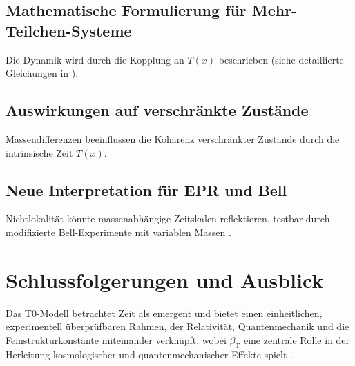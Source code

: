 \documentclass[12pt,a4paper]{article}
\newcommand{\Tfield}{T(x)}
\newcommand{\betaT}{\beta_{\text{T}}}
\begin{document}
	\subsection{Mathematische Formulierung für Mehr-Teilchen-Systeme}
	Die Dynamik wird durch die Kopplung an \(\Tfield\) beschrieben (siehe detaillierte Gleichungen in \cite{pascher_lagrange_2025}).
	
	\subsection{Auswirkungen auf verschränkte Zustände}
	Massendifferenzen beeinflussen die Kohärenz verschränkter Zustände durch die intrinsische Zeit \(\Tfield\).
	
	\subsection{Neue Interpretation für EPR und Bell}
	Nichtlokalität könnte massenabhängige Zeitskalen reflektieren, testbar durch modifizierte Bell-Experimente mit variablen Massen \cite{bell}.
	
	\section{Schlussfolgerungen und Ausblick}
	Das T0-Modell betrachtet Zeit als emergent und bietet einen einheitlichen, experimentell überprüfbaren Rahmen, der Relativität, Quantenmechanik und die Feinstrukturkonstante miteinander verknüpft, wobei \(\betaT\) eine zentrale Rolle in der Herleitung kosmologischer und quantenmechanischer Effekte spielt \cite{pascher_galaxies_2025, pascher_alphabeta_2025}.
	
\end{document}
